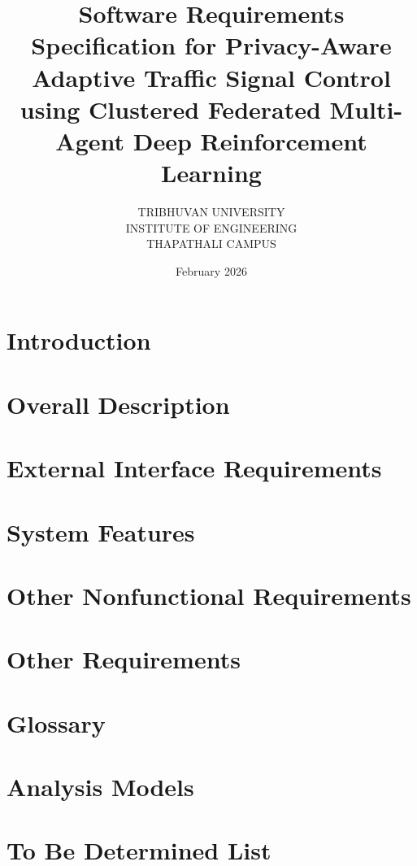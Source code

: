 \documentclass{report}
\title{Software Requirements Specification for Privacy-Aware Adaptive Traffic Signal Control using Clustered Federated Multi-Agent Deep Reinforcement Learning}
\author{TRIBHUVAN UNIVERSITY \\ INSTITUTE OF ENGINEERING \\ THAPATHALI CAMPUS}
\date{February 2026}
\begin{document}


\tableofcontents
\newpage
\listoftables
\newpage
\listoffigures
\newpage




\chapter{Introduction}


\chapter{Overall Description}


\chapter{External Interface Requirements}


\chapter{System Features}


\chapter{Other Nonfunctional Requirements}


\chapter{Other Requirements}


\appendix
\chapter{Glossary}


\chapter{Analysis Models}


\chapter{To Be Determined List}

\end{document}
